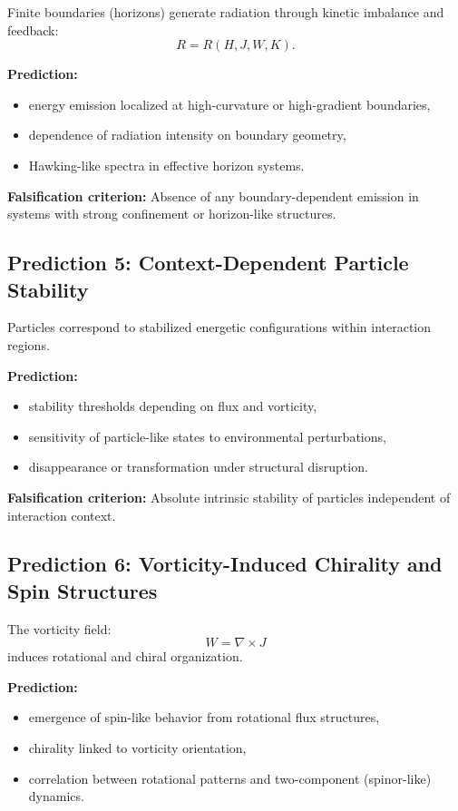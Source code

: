 \documentclass[11pt]{article}
\begin{document}
Finite boundaries (horizons) generate radiation through kinetic imbalance and feedback:
\begin{equation}
R = R(H, J, W, K).
\end{equation}

\textbf{Prediction:}
\begin{itemize}
\item energy emission localized at high-curvature or high-gradient boundaries,
\item dependence of radiation intensity on boundary geometry,
\item Hawking-like spectra in effective horizon systems.
\end{itemize}

\textbf{Falsification criterion:}  
Absence of any boundary-dependent emission in systems with strong confinement or horizon-like structures.

\subsection{Prediction 5: Context-Dependent Particle Stability}

Particles correspond to stabilized energetic configurations within interaction regions.

\textbf{Prediction:}
\begin{itemize}
\item stability thresholds depending on flux and vorticity,
\item sensitivity of particle-like states to environmental perturbations,
\item disappearance or transformation under structural disruption.
\end{itemize}

\textbf{Falsification criterion:}  
Absolute intrinsic stability of particles independent of interaction context.

\subsection{Prediction 6: Vorticity-Induced Chirality and Spin Structures}

The vorticity field:
\begin{equation}
W = \nabla \times J
\end{equation}
induces rotational and chiral organization.

\textbf{Prediction:}
\begin{itemize}
\item emergence of spin-like behavior from rotational flux structures,
\item chirality linked to vorticity orientation,
\item correlation between rotational patterns and two-component (spinor-like) dynamics.
\end{itemize}
\end{document}
